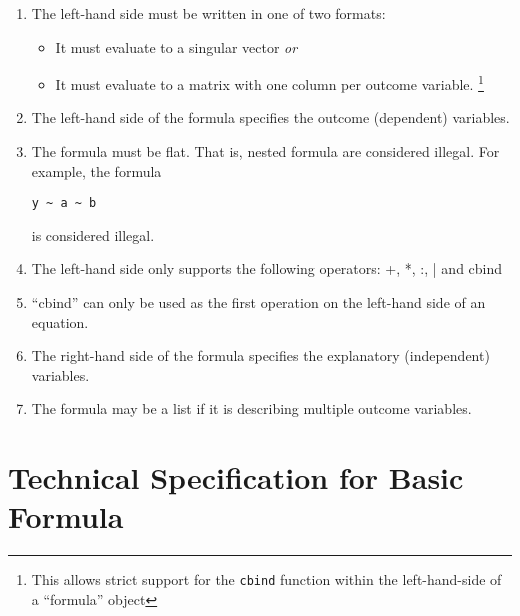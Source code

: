 \documentclass{article}
\begin{document}
\begin{enumerate}

  \item The left-hand side must be written in one of two formats:

    \begin{itemize}

      \item It must evaluate to a singular vector \emph{or}

      \item It must evaluate to a matrix with one column per outcome variable.
        \footnote{
          This allows strict support for the {\tt cbind} function within the
          left-hand-side of a ``formula'' object
        }

    \end{itemize}

  \item The left-hand side of the formula specifies the outcome (dependent) variables.

  \item The formula must be flat. That is, nested formula are considered
    illegal. For example, the formula \begin{verbatim}y ~ a ~ b\end{verbatim} is considered illegal.

  \item The left-hand side only supports the following operators: +, *, :, | and cbind

  \item ``cbind'' can only be used as the first operation on the left-hand side of an equation.

  \item The right-hand side of the formula specifies the explanatory (independent) variables.

  \item The formula may be a list if it is describing multiple outcome variables.

\end{enumerate}



\section{Technical Specification for Basic Formula}
\end{document}
